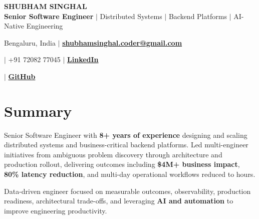 \documentclass[10pt,a4paper]{article}
\newcommand{\resumelink}[2]{%
    \href{#1}{\textcolor{linkcolor}{\textbf{#2}}}
}
\begin{document}

\begin{center}

    {\fontsize{21}{23}\selectfont
    \textbf{SHUBHAM SINGHAL}} \\[5pt]

    {\normalsize
    \textbf{Senior Software Engineer}
    \enspace $\vert$ \enspace
    Distributed Systems
    \enspace $\vert$ \enspace
    Backend Platforms
    \enspace $\vert$ \enspace
    AI-Native Engineering
    } \\[7pt]

    {\small
    \textcolor{secondary}{Bengaluru, India}
    \enspace $\vert$ \enspace
    \resumelink{mailto:shubhamsinghal.coder@gmail.com}
    {shubhamsinghal.coder@gmail.com}
    \enspace $\vert$ \enspace
    \textcolor{secondary}{+91 72082 77045}
    \enspace $\vert$ \enspace
    \resumelink{https://www.linkedin.com/in/shubhampsinghal/}{LinkedIn}
    \enspace $\vert$ \enspace
    \resumelink{https://github.com/singhalshubham89}{GitHub}
    }

\end{center}

\vspace{-1pt}


\section{Summary}

Senior Software Engineer with \textbf{8+ years of experience} designing and
scaling distributed systems and business-critical backend platforms.
Led multi-engineer initiatives from ambiguous problem discovery through
architecture and production rollout, delivering outcomes including
\textbf{\$4M+ business impact}, \textbf{80\% latency reduction}, and
multi-day operational workflows reduced to hours.

\vspace{5pt}

Data-driven engineer focused on measurable outcomes, observability,
production readiness, architectural trade-offs, and leveraging
\textbf{AI and automation} to improve engineering productivity.

\end{document}
